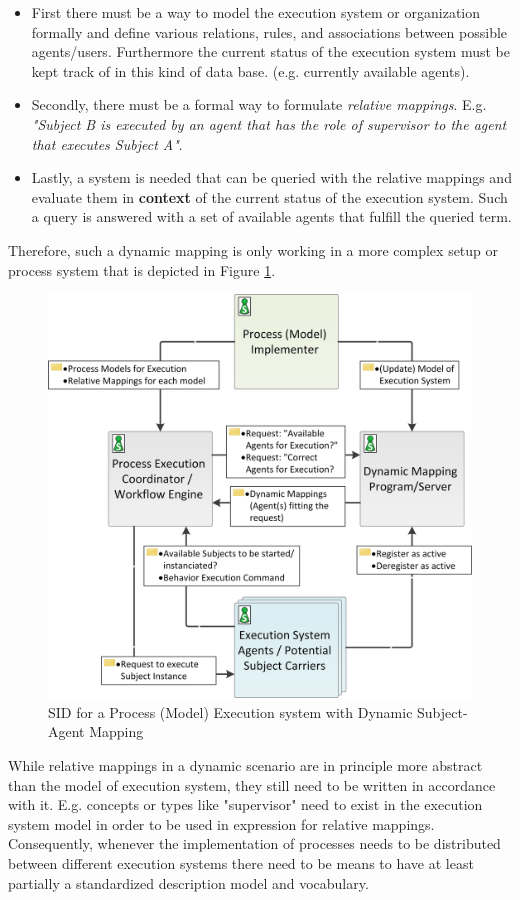 \begin{itemize}
    \item First there must be a way to model the execution system or organization formally and define various relations, rules, and associations between possible agents/users. Furthermore the current status of the execution system must be kept track of in this kind of data base. (e.g. currently available agents).
    \item Secondly, there must be a formal way to formulate \textit{relative mappings}. E.g. \textit{"Subject B is executed by an agent that has the role of supervisor to the agent that executes Subject A"}.
    \item Lastly, a system is needed that can be queried with the relative mappings and evaluate them in \textbf{context} of the current status of the execution system. Such a query is answered with a set of available agents that fulfill the queried term. 
\end{itemize}

Therefore, such a dynamic mapping is only working in a more complex setup or process system that is depicted in Figure \ref{fig:dynamicMappingProcessSystem}. 

\begin{figure}[htbp]
	\centering
	\includegraphics[width=0.7\linewidth]{Figures/Implementation/DynamicMappingSystemSID.png}
	\caption[SID for a Process (Model) Execution system with Dynamic Subject-Agent Mapping]{SID for a Process (Model) Execution system with Dynamic Subject-Agent Mapping}
	\label{fig:dynamicMappingProcessSystem}
\end{figure}

While relative mappings in a dynamic scenario are in principle more abstract than the model of execution system, they still need to be written in accordance with it. E.g. concepts or types like "supervisor"  need to exist in the execution system model in order to be used in expression for relative mappings. Consequently, whenever the implementation of processes needs to be distributed between different execution systems there need to be means to have at least partially a standardized description model and vocabulary. 



